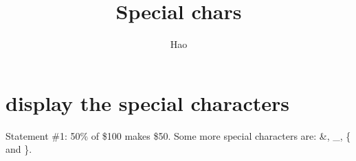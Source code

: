 \documentclass[a4paper,10pt]{article}
\title{Special chars}
\author{Hao}
\begin{document}
\maketitle

\section{display the special characters}
Statement \#1:
50\% of \$100 makes \$50.
Some more special characters are:
\&,
\_,
\{
and \}.
\end{document}
